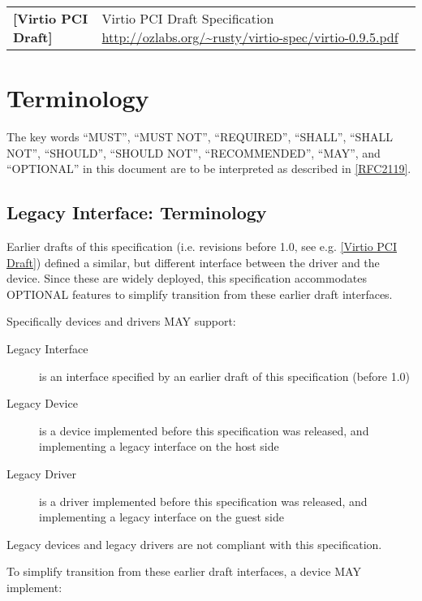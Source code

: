 \begin{longtable}{l p{5in}}
	\label{intro:Virtio PCI Draft}\textbf{[Virtio PCI Draft]} &
	Virtio PCI Draft Specification
	\newline\url{http://ozlabs.org/~rusty/virtio-spec/virtio-0.9.5.pdf}\\
\end{longtable}

\section{Terminology}\label{Terminology}

The key words ``MUST'', ``MUST NOT'', ``REQUIRED'', ``SHALL'', ``SHALL NOT'', ``SHOULD'', ``SHOULD NOT'', ``RECOMMENDED'', ``MAY'', and ``OPTIONAL'' in this document are to be interpreted as described in \hyperref[intro:rfc2119]{[RFC2119]}.

\subsection{Legacy Interface: Terminology}\label{intro:Legacy
Interface: Terminology}

Earlier drafts of this specification (i.e. revisions before 1.0,
see e.g. \hyperref[intro:Virtio PCI Draft]{[Virtio PCI Draft]})
defined a similar, but different
interface between the driver and the device.
Since these are widely deployed, this specification
accommodates OPTIONAL features to simplify transition
from these earlier draft interfaces.

Specifically devices and drivers MAY support:
\begin{description}
\item[Legacy Interface]
        is an interface specified by an earlier draft of this specification
        (before 1.0)
\item[Legacy Device]
        is a device implemented before this specification was released,
        and implementing a legacy interface on the host side
\item[Legacy Driver]
        is a driver implemented before this specification was released,
        and implementing a legacy interface on the guest side
\end{description}

Legacy devices and legacy drivers are not compliant with this
specification.

To simplify transition from these earlier draft interfaces,
a device MAY implement:

